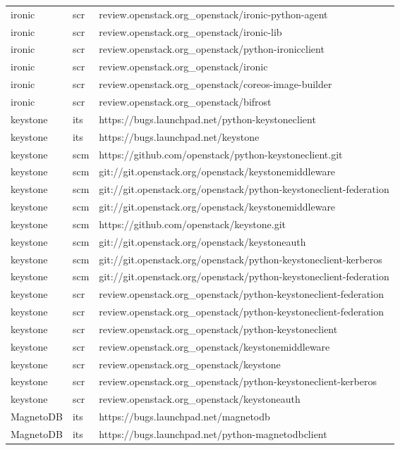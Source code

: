 \begin{center}
\begin{longtable}{|p{4cm}|p{1cm}|p{10cm}|}
ironic&scr&review.openstack.org\_openstack/ironic-python-agent\\ 
ironic&scr&review.openstack.org\_openstack/ironic-lib\\ 
ironic&scr&review.openstack.org\_openstack/python-ironicclient\\ 
ironic&scr&review.openstack.org\_openstack/ironic\\ 
ironic&scr&review.openstack.org\_openstack/coreos-image-builder\\ 
ironic&scr&review.openstack.org\_openstack/bifrost\\ 
keystone&its&https://bugs.launchpad.net/python-keystoneclient\\ 
keystone&its&https://bugs.launchpad.net/keystone\\ 
keystone&scm&https://github.com/openstack/python-keystoneclient.git\\ 
keystone&scm&git://git.openstack.org/openstack/keystonemiddleware\\ 
keystone&scm&git://git.openstack.org/openstack/python-keystoneclient-federation\\ 
keystone&scm&git://git.openstack.org/openstack/keystonemiddleware\\ 
keystone&scm&https://github.com/openstack/keystone.git\\ 
keystone&scm&git://git.openstack.org/openstack/keystoneauth\\ 
keystone&scm&git://git.openstack.org/openstack/python-keystoneclient-kerberos\\ 
keystone&scm&git://git.openstack.org/openstack/python-keystoneclient-federation\\ 
keystone&scr&review.openstack.org\_openstack/python-keystoneclient-federation\\ 
keystone&scr&review.openstack.org\_openstack/python-keystoneclient-federation\\ 
keystone&scr&review.openstack.org\_openstack/python-keystoneclient\\ 
keystone&scr&review.openstack.org\_openstack/keystonemiddleware\\ 
keystone&scr&review.openstack.org\_openstack/keystone\\ 
keystone&scr&review.openstack.org\_openstack/python-keystoneclient-kerberos\\ 
keystone&scr&review.openstack.org\_openstack/keystoneauth\\ 
MagnetoDB&its&https://bugs.launchpad.net/magnetodb\\ 
MagnetoDB&its&https://bugs.launchpad.net/python-magnetodbclient\\ 

\end{longtable}
\end{center}
